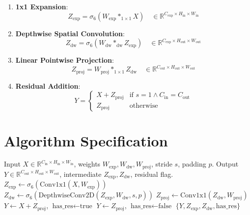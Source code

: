 \documentclass[11pt,a4paper]{article}
\theoremstyle{definition}
\begin{document}
\begin{enumerate}
    \item \textbf{1x1 Expansion}:
    \begin{equation}
    Z_{\text{exp}} = \sigma_6(W_{\text{exp}} *_{1\times 1} X) \quad \in \mathbb{R}^{C_{\text{exp}} \times H_{\text{in}} \times W_{\text{in}}}
    \end{equation}
    \item \textbf{Depthwise Spatial Convolution}:
    \begin{equation}
    Z_{\text{dw}} = \sigma_6(W_{\text{dw}} *_{\text{dw}} Z_{\text{exp}}) \quad \in \mathbb{R}^{C_{\text{exp}} \times H_{\text{out}} \times W_{\text{out}}}
    \end{equation}
    \item \textbf{Linear Pointwise Projection}:
    \begin{equation}
    Z_{\text{proj}} = W_{\text{proj}} *_{1\times 1} Z_{\text{dw}} \quad \in \mathbb{R}^{C_{\text{out}} \times H_{\text{out}} \times W_{\text{out}}}
    \end{equation}
    \item \textbf{Residual Addition}:
    \begin{equation}
    Y = \begin{cases} X + Z_{\text{proj}} & \text{if } s = 1 \land C_{\text{in}} = C_{\text{out}} \\ Z_{\text{proj}} & \text{otherwise} \end{cases}
    \end{equation}
\end{enumerate}

\section{Algorithm Specification}

\begin{algorithm}[H]
\caption{Inverted Residual and Linear Bottleneck Forward Pass}
\label{alg:inverted_residual}
\begin{algorithmic}[1]
\Require Input $X \in \mathbb{R}^{C_{\text{in}} \times H_{\text{in}} \times W_{\text{in}}}$, weights $W_{\text{exp}}, W_{\text{dw}}, W_{\text{proj}}$, stride $s$, padding $p$.
\Ensure Output $Y \in \mathbb{R}^{C_{\text{out}} \times H_{\text{out}} \times W_{\text{out}}}$, intermediate $Z_{\text{exp}}, Z_{\text{dw}}$, residual flag.
\State $Z_{\text{exp}} \gets \sigma_6(\text{Conv1x1}(X, W_{\text{exp}}))$
\State $Z_{\text{dw}} \gets \sigma_6(\text{DepthwiseConv2D}(Z_{\text{exp}}, W_{\text{dw}}, s, p))$
\State $Z_{\text{proj}} \gets \text{Conv1x1}(Z_{\text{dw}}, W_{\text{proj}})$ 
    \State $Y \gets X + Z_{\text{proj}}$, $\text{has\_res} \gets \text{true}$
\Else
    \State $Y \gets Z_{\text{proj}}$, $\text{has\_res} \gets \text{false}$
\EndIf
\State \Return $\{Y, Z_{\text{exp}}, Z_{\text{dw}}, \text{has\_res}\}$
\end{algorithmic}
\end{algorithm}
\end{document}
